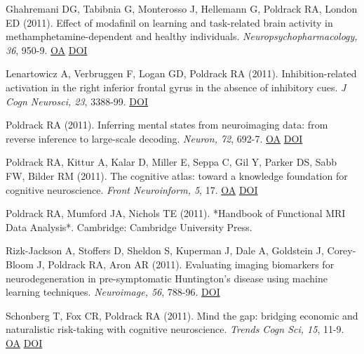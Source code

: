 \documentclass[10pt, letterpaper]{article}
\begin{document}
Ghahremani DG, Tabibnia G, Monterosso J, Hellemann G, Poldrack RA, London ED (2011). Effect of modafinil on learning and task-related brain activity in methamphetamine-dependent and healthy individuals. \textit{Neuropsychopharmacology, 36}, 950-9. \href{https://www.ncbi.nlm.nih.gov/pmc/articles/PMC3077264}{OA} \href{http://dx.doi.org/10.1038/npp.2010.233}{DOI} \vspace{2mm}

Lenartowicz A, Verbruggen F, Logan GD, Poldrack RA (2011). Inhibition-related activation in the right inferior frontal gyrus in the absence of inhibitory cues. \textit{J Cogn Neurosci, 23}, 3388-99. \href{http://dx.doi.org/10.1162/jocn_a_00031}{DOI} \vspace{2mm}

Poldrack RA (2011). Inferring mental states from neuroimaging data: from reverse inference to large-scale decoding. \textit{Neuron, 72}, 692-7. \href{https://www.ncbi.nlm.nih.gov/pmc/articles/PMC3240863}{OA} \href{http://dx.doi.org/10.1016/j.neuron.2011.11.001}{DOI} \vspace{2mm}

Poldrack RA, Kittur A, Kalar D, Miller E, Seppa C, Gil Y, Parker DS, Sabb FW, Bilder RM (2011). The cognitive atlas: toward a knowledge foundation for cognitive neuroscience. \textit{Front Neuroinform, 5}, 17. \href{https://www.ncbi.nlm.nih.gov/pmc/articles/PMC3167196}{OA} \href{http://dx.doi.org/10.3389/fninf.2011.00017}{DOI} \vspace{2mm}

Poldrack RA, Mumford JA, Nichols TE (2011).  *Handbook of Functional MRI Data Analysis*. Cambridge: Cambridge University Press. \vspace{2mm}

Rizk-Jackson A, Stoffers D, Sheldon S, Kuperman J, Dale A, Goldstein J, Corey-Bloom J, Poldrack RA, Aron AR (2011). Evaluating imaging biomarkers for neurodegeneration in pre-symptomatic Huntington's disease using machine learning techniques. \textit{Neuroimage, 56}, 788-96. \href{http://dx.doi.org/10.1016/j.neuroimage.2010.04.273}{DOI} \vspace{2mm}

Schonberg T, Fox CR, Poldrack RA (2011). Mind the gap: bridging economic and naturalistic risk-taking with cognitive neuroscience. \textit{Trends Cogn Sci, 15}, 11-9. \href{https://www.ncbi.nlm.nih.gov/pmc/articles/PMC3014440}{OA} \href{http://dx.doi.org/10.1016/j.tics.2010.10.002}{DOI} \vspace{2mm}
\end{document}
